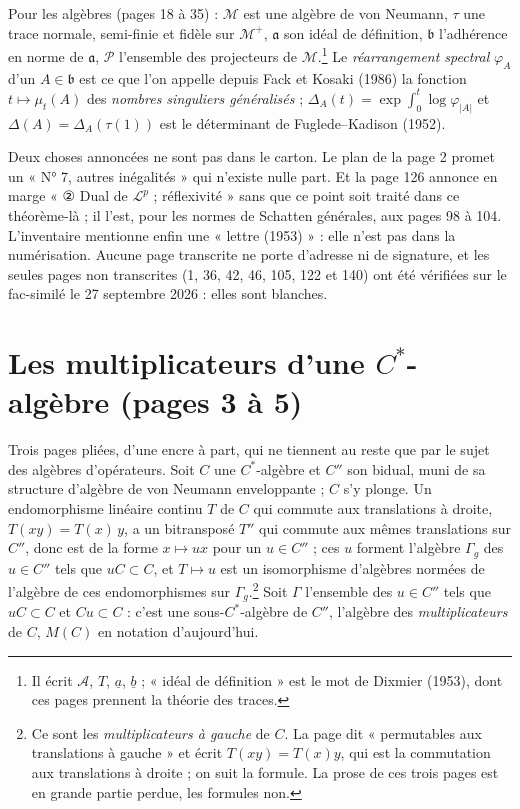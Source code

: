 \documentclass[11pt,a4paper]{article}
\begin{document}
Pour les algèbres (pages 18 à 35) : $\mathcal{M}$ est une algèbre de von
Neumann, $\tau$ une trace normale, semi-finie et fidèle sur $\mathcal{M}^{+}$,
$\mathfrak{a}$ son idéal de définition, $\mathfrak{b}$ l'adhérence en norme de
$\mathfrak{a}$, $\mathcal{P}$ l'ensemble des projecteurs de
$\mathcal{M}$.\footnote{Il écrit $\mathcal{A}$, $T$, $\underline{a}$,
$\underline{b}$ ; « idéal de définition » est le mot de Dixmier (1953), dont
ces pages prennent la théorie des traces.} Le \emph{réarrangement spectral}
$\varphi_A$ d'un $A \in \mathfrak{b}$ est ce que l'on appelle depuis
Fack et Kosaki (1986) la fonction $t \mapsto \mu_t(A)$ des \emph{nombres
singuliers généralisés} ; $\Delta_A(t) = \exp\int_0^t \log\varphi_{|A|}$ et
$\Delta(A) = \Delta_A(\tau(1))$ est le déterminant de Fuglede--Kadison
(1952).

Deux choses annoncées ne sont pas dans le carton. Le plan de la page 2
promet un « N° 7, autres inégalités » qui n'existe nulle part. Et la page
126 annonce en marge « ② Dual de $\mathcal{L}^p$ ; réflexivité » sans que ce
point soit traité dans ce théorème-là ; il l'est, pour les normes de
Schatten générales, aux pages 98 à 104. L'inventaire mentionne enfin une
« lettre (1953) » : elle n'est pas dans la numérisation. Aucune page
transcrite ne porte d'adresse ni de signature, et les seules pages non
transcrites (1, 36, 42, 46, 105, 122 et 140) ont été vérifiées sur le
fac-similé le 27 septembre 2026 : elles sont blanches.

\section*{Les multiplicateurs d'une $C^{*}$-algèbre (pages 3 à 5)}

Trois pages pliées, d'une encre à part, qui ne tiennent au reste que par le
sujet des algèbres d'opérateurs. Soit $C$ une $C^{*}$-algèbre et $C''$ son
bidual, muni de sa structure d'algèbre de von Neumann enveloppante ; $C$ s'y
plonge. Un endomorphisme linéaire continu $T$ de $C$ qui commute aux
translations à droite, $T(xy) = T(x)\,y$, a un bitransposé $T''$ qui commute
aux mêmes translations sur $C''$, donc est de la forme $x \mapsto ux$ pour un
$u \in C''$ ; ces $u$ forment l'algèbre $\Gamma_g$ des $u \in C''$ tels que
$uC \subset C$, et $T \mapsto u$ est un isomorphisme d'algèbres normées de
l'algèbre de ces endomorphismes sur $\Gamma_g$.\footnote{Ce sont les
\emph{multiplicateurs à gauche} de $C$. La page dit « permutables aux
translations à gauche » et écrit $T(xy) = T(x)y$, qui est la commutation aux
translations à droite ; on suit la formule. La prose de ces trois pages est
en grande partie perdue, les formules non.} Soit $\Gamma$ l'ensemble des
$u \in C''$ tels que $uC \subset C$ et $Cu \subset C$ : c'est une
sous-$C^{*}$-algèbre de $C''$, l'algèbre des \emph{multiplicateurs} de $C$,
$M(C)$ en notation d'aujourd'hui.
\end{document}
